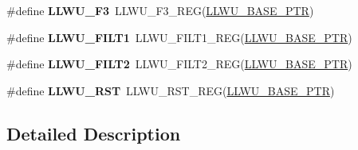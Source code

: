\begin{DoxyCompactItemize}
\item 
\hypertarget{group___l_l_w_u___register___accessor___macros_gaaf3f95074e10d498b1522014ab7d5bfe}{}\#define {\bfseries L\+L\+W\+U\+\_\+\+F3}~L\+L\+W\+U\+\_\+\+F3\+\_\+\+R\+E\+G(\hyperlink{group___l_l_w_u___peripheral_ga89c97b9e8756088cb3d8617c022ae6ac}{L\+L\+W\+U\+\_\+\+B\+A\+S\+E\+\_\+\+P\+T\+R})\label{group___l_l_w_u___register___accessor___macros_gaaf3f95074e10d498b1522014ab7d5bfe}

\item 
\hypertarget{group___l_l_w_u___register___accessor___macros_ga0ccd44a49b9f822b80e5d8c4935d94fe}{}\#define {\bfseries L\+L\+W\+U\+\_\+\+F\+I\+L\+T1}~L\+L\+W\+U\+\_\+\+F\+I\+L\+T1\+\_\+\+R\+E\+G(\hyperlink{group___l_l_w_u___peripheral_ga89c97b9e8756088cb3d8617c022ae6ac}{L\+L\+W\+U\+\_\+\+B\+A\+S\+E\+\_\+\+P\+T\+R})\label{group___l_l_w_u___register___accessor___macros_ga0ccd44a49b9f822b80e5d8c4935d94fe}

\item 
\hypertarget{group___l_l_w_u___register___accessor___macros_gae5e6484abe7ce06b0e85852c098959e7}{}\#define {\bfseries L\+L\+W\+U\+\_\+\+F\+I\+L\+T2}~L\+L\+W\+U\+\_\+\+F\+I\+L\+T2\+\_\+\+R\+E\+G(\hyperlink{group___l_l_w_u___peripheral_ga89c97b9e8756088cb3d8617c022ae6ac}{L\+L\+W\+U\+\_\+\+B\+A\+S\+E\+\_\+\+P\+T\+R})\label{group___l_l_w_u___register___accessor___macros_gae5e6484abe7ce06b0e85852c098959e7}

\item 
\hypertarget{group___l_l_w_u___register___accessor___macros_gafcdb7fa78ef597a1df61a7baa2bb5890}{}\#define {\bfseries L\+L\+W\+U\+\_\+\+R\+S\+T}~L\+L\+W\+U\+\_\+\+R\+S\+T\+\_\+\+R\+E\+G(\hyperlink{group___l_l_w_u___peripheral_ga89c97b9e8756088cb3d8617c022ae6ac}{L\+L\+W\+U\+\_\+\+B\+A\+S\+E\+\_\+\+P\+T\+R})\label{group___l_l_w_u___register___accessor___macros_gafcdb7fa78ef597a1df61a7baa2bb5890}

\end{DoxyCompactItemize}


\subsection{Detailed Description}
